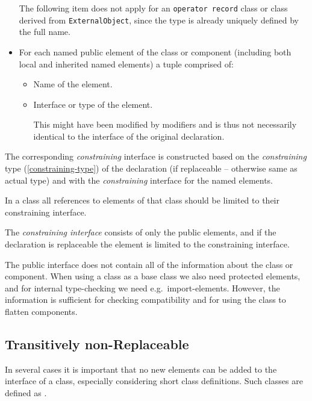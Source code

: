 \begin{itemize}
  The following item does not apply for an \lstinline!operator record! class or class derived from \lstinline!ExternalObject!, since the type is already uniquely defined by the full name.
\item
  For each named public element of the class or component (including
  both local and inherited named elements) a tuple comprised of:
  \begin{itemize}
  \item
    Name of the element.
  \item
    Interface or type of the element.
    \begin{nonnormative}
    This might have been modified by modifiers and is thus not necessarily identical to the interface of the original declaration.
    \end{nonnormative}
  \end{itemize}
\end{itemize}

The corresponding \emph{constraining} interface is constructed based on the \emph{constraining} type (\cref{constraining-type}) of the declaration (if replaceable -- otherwise same as actual
type) and with the \emph{constraining} interface for the named elements.

In a class all references to elements of that class should be limited to their constraining interface.

\begin{nonnormative}
The \emph{constraining interface} consists of only the public elements, and if the declaration is replaceable the element is limited to the constraining interface.
\end{nonnormative}

\begin{nonnormative}
The public interface does not contain all of the information about the class or component.
When using a class as a base class we also need protected elements, and for internal type-checking we need e.g.\ import-elements.
However, the information is sufficient for checking compatibility and for using the class to flatten components.
\end{nonnormative}

\subsection{Transitively non-Replaceable}\label{transitively-non-replaceable}

\begin{nonnormative}
In several cases it is important that no new elements can be added to the interface of a class, especially considering short class definitions.
Such classes are defined as .
\end{nonnormative}

